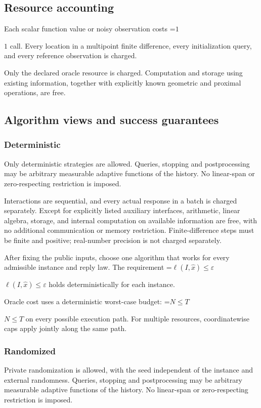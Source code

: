 \documentclass[10pt,a4paper]{article}
\newcommand{\AtlasMath}[1]{\par\begingroup\centering\setbox0=\hbox{$\displaystyle #1$}\ifdim\wd0>1.4\linewidth\typeout{ATLAS WIDE FORMULA: \the\wd0}\fi\ifdim\wd0>\linewidth\resizebox{\linewidth}{!}{\box0}\else\box0\fi\par\endgroup}
\newcommand{\AtlasInlineMath}[1]{\begingroup\setbox0=\hbox{$#1$}\ifdim\wd0>.4\linewidth\endgroup\AtlasMath{#1}\else\endgroup$#1$\fi}
\begin{document}
\subsection{Resource accounting}
Each scalar function value or noisy observation costs \AtlasInlineMath{1} call. Every location in a multipoint finite difference, every initialization query, and every reference observation is charged.

Only the declared oracle resource is charged. Computation and storage using existing information, together with explicitly known geometric and proximal operations, are free.

\subsection{Algorithm views and success guarantees}
\subsubsection{Deterministic}
Only deterministic strategies are allowed. Queries, stopping and postprocessing may be arbitrary measurable adaptive functions of the history. No linear-span or zero-respecting restriction is imposed.

Interactions are sequential, and every actual response in a batch is charged separately. Except for explicitly listed auxiliary interfaces, arithmetic, linear algebra, storage, and internal computation on available information are free, with no additional communication or memory restriction. Finite-difference steps must be finite and positive; real-number precision is not charged separately.

After fixing the public inputs, choose one algorithm that works for every admissible instance and reply law. The requirement \AtlasInlineMath{\ell(I,\widehat{x})\le \varepsilon} holds deterministically for each instance.

Oracle cost uses a deterministic worst-case budget: \AtlasInlineMath{N\le T} on every possible execution path. For multiple resources, coordinatewise caps apply jointly along the same path.

\subsubsection{Randomized}
Private randomization is allowed, with the seed independent of the instance and external randomness. Queries, stopping and postprocessing may be arbitrary measurable adaptive functions of the history. No linear-span or zero-respecting restriction is imposed.
\end{document}
